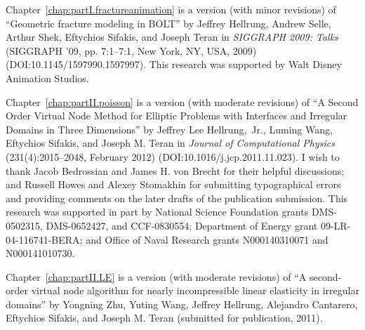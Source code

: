 {Chapter~\ref{chap:partI.fractureanimation} is a version (with minor revisions) of ``Geometric fracture modeling in BOLT'' by Jeffrey Hellrung, Andrew Selle, Arthur Shek, Eftychios Sifakis, and Joseph Teran in \textit{SIGGRAPH 2009: Talks} (SIGGRAPH '09, pp. 7:1--7:1, New York, NY, USA, 2009) \linebreak[4] (DOI:10.1145/1597990.1597997). This research was supported by Walt Disney Animation Studios.

Chapter~\ref{chap:partII.poisson} is a version (with moderate revisions) of ``A Second Order Virtual Node Method for Elliptic Problems with Interfaces and Irregular Domains in Three Dimensions'' by Jeffrey Lee Hellrung,~Jr., Luming Wang, Eftychios Sifakis, and Joseph M. Teran in \textit{Journal of Computational Physics} (231(4):2015--2048, February 2012) (DOI:10.1016/j.jcp.2011.11.023). I wish to thank Jacob Bedrossian and James H. von Brecht for their helpful discussions; and Russell Howes and Alexey Stomakhin for submitting typographical errors and providing comments on the later drafts of the publication submission. This research was supported in part by National Science Foundation grants DMS-0502315, DMS-0652427, and CCF-0830554; Department of Energy grant 09-LR-04-116741-BERA; and Office of Naval Research grants N000140310071 and N000141010730.

Chapter~\ref{chap:partII.LE} is a version (with moderate revisions) of ``A second-order virtual node algorithm for nearly incompressible linear elasticity in irregular domains'' by Yongning Zhu, Yuting Wang, Jeffrey Hellrung, Alejandro Cantarero, Eftychios Sifakis, and Joseph M. Teran (submitted for publication, 2011).
}


